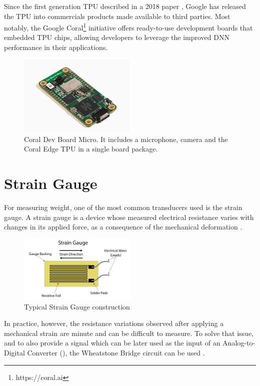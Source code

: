 \documentclass[openright]{normas-utf-tex} %
\begin{document}
Since the first generation TPU described in a 2018 paper \cite{Google2015},
Google has released the TPU into commercials products made available to third
parties. Most notably, the Google Coral\footnote{https://coral.ai} initiative
offers ready-to-use development boards that embedded TPU chips, allowing
developers to leverage the improved DNN performance in their applications.

\begin{figure}[H]
	\centering
	\includegraphics[width=0.5\textwidth]{./images/coralboard.png}
	\caption[Coral Dev Board Micro]{Coral Dev Board Micro. It includes a microphone, camera and the Coral Edge TPU in a single board package.}
\end{figure}

\section{Strain Gauge}

For measuring weight, one of the most common transducers used is the strain
gauge. A strain gauge is a device whose measured electrical
resistance varies with changes in its applied force, as a consequence of the
mechanical deformation \cite{Stefanescu}.

\begin{figure}[H]
	\centering
	\includegraphics[width=0.5\textwidth]{./images/straingauge.png}
	\caption[Typical Strain Gauge construction]{Typical Strain Gauge construction}
	\label{fig:gauge1}
\end{figure}

In practice, however, the resistance variations observed after applying a
mechanical strain are minute and can be difficult to measure. To solve that issue,
and to also provide a signal which can be later used as the input of an
Analog-to-Digital Converter (), the Wheatstone
Bridge circuit can be used \cite{Michigan2020}.
\end{document}
